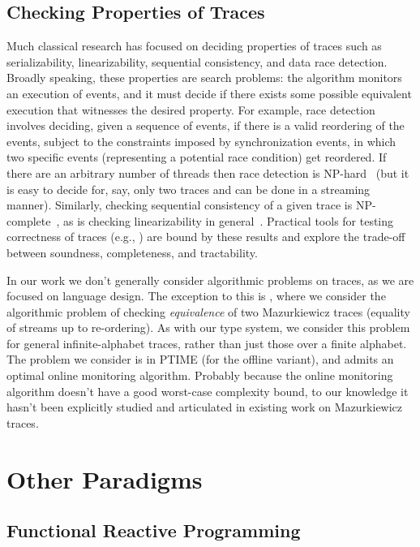 \subsection{Checking Properties of Traces}

Much classical research has focused on deciding properties of traces such as serializability, linearizability, sequential consistency, and data race detection.
Broadly speaking, these properties are search problems: the algorithm monitors an execution of events, and it must decide if there exists some possible equivalent execution that witnesses the desired property. For example, race detection involves deciding, given a sequence of events, if there is a valid reordering of the events, subject to the constraints imposed by synchronization events, in which two specific events (representing a potential race condition) get reordered. If there are an arbitrary number of threads then race detection is NP-hard~\cite{netzer1990complexity,netzer1992race}
(but it is easy to decide for, say, only two traces and can be done in a streaming manner).
Similarly, checking sequential consistency of a given trace is NP-complete~\cite{gibbons1992complexity},
as is checking linearizability in general~\cite{gibbons1997testing}.
Practical tools for testing correctness of traces (e.g., \cite{savage1997eraser,park2011efficient,sen2008race,wing1993testing,burckhardt2010line,lowe2017testing}) are bound by these results and explore the trade-off between soundness, completeness, and tractability.

In our work we don't generally consider algorithmic problems on traces,
as we are focused on language design.
The exception to this is ,
where we consider the algorithmic problem of checking \emph{equivalence} of two Mazurkiewicz traces (equality of streams up to re-ordering).
As with our type system, we consider this problem for general infinite-alphabet traces, rather than just those over a finite alphabet.
The problem we consider is in PTIME (for the offline variant), and admits an optimal online monitoring algorithm.
Probably because the online monitoring algorithm doesn't have a good worst-case complexity bound, to our knowledge it hasn't been explicitly studied and articulated in existing work on Mazurkiewicz traces.

\section{Other Paradigms}

\subsection{Functional Reactive Programming}


